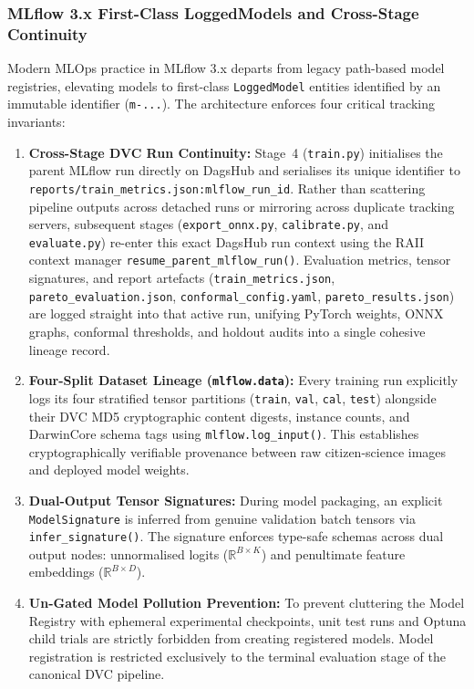 \subsubsection{MLflow 3.x First-Class LoggedModels and Cross-Stage Continuity}
\label{sec:mlflow3_logged_models}

Modern MLOps practice in MLflow 3.x departs from legacy path-based model registries, elevating models to first-class \texttt{LoggedModel} entities identified by an immutable identifier (\texttt{m-...}). The architecture enforces four critical tracking invariants:
\begin{enumerate}
    \item \textbf{Cross-Stage DVC Run Continuity:} Stage~4 (\nolinkurl{train.py}) initialises the parent MLflow run directly on DagsHub and serialises its unique identifier to \nolinkurl{reports/train_metrics.json:mlflow_run_id}. Rather than scattering pipeline outputs across detached runs or mirroring across duplicate tracking servers, subsequent stages (\nolinkurl{export_onnx.py}, \nolinkurl{calibrate.py}, and \nolinkurl{evaluate.py}) re-enter this exact DagsHub run context using the RAII context manager \nolinkurl{resume_parent_mlflow_run()}. Evaluation metrics, tensor signatures, and report artefacts (\nolinkurl{train_metrics.json}, \nolinkurl{pareto_evaluation.json}, \nolinkurl{conformal_config.yaml}, \nolinkurl{pareto_results.json}) are logged straight into that active run, unifying PyTorch weights, ONNX graphs, conformal thresholds, and holdout audits into a single cohesive lineage record.
    \item \textbf{Four-Split Dataset Lineage (\texttt{mlflow.data}):} Every training run explicitly logs its four stratified tensor partitions (\texttt{train}, \texttt{val}, \texttt{cal}, \texttt{test}) alongside their DVC MD5 cryptographic content digests, instance counts, and DarwinCore schema tags using \nolinkurl{mlflow.log_input()}. This establishes cryptographically verifiable provenance between raw citizen-science images and deployed model weights.
    \item \textbf{Dual-Output Tensor Signatures:} During model packaging, an explicit \texttt{ModelSignature} is inferred from genuine validation batch tensors via \nolinkurl{infer_signature()}. The signature enforces type-safe schemas across dual output nodes: unnormalised logits ($\mathbb{R}^{B \times K}$) and penultimate feature embeddings ($\mathbb{R}^{B \times D}$).
    \item \textbf{Un-Gated Model Pollution Prevention:} To prevent cluttering the Model Registry with ephemeral experimental checkpoints, unit test runs and Optuna child trials are strictly forbidden from creating registered models. Model registration is restricted exclusively to the terminal evaluation stage of the canonical DVC pipeline.
\end{enumerate}

